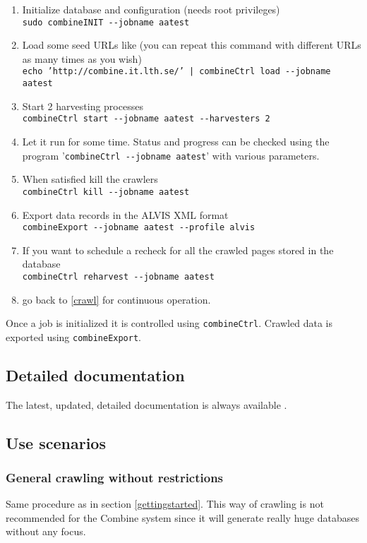 \begin{enumerate}
\item    Initialize database and configuration (needs root privileges)\\
{\tt  sudo combineINIT \verb+--+jobname aatest}
\item \label{load} Load some seed URLs like (you can repeat this command with different URLs as many times as you wish)\\
{\tt  echo 'http://combine.it.lth.se/' | combineCtrl  load \verb+--+jobname aatest}
\item \label{crawl}   Start 2 harvesting processes\\
{\tt  combineCtrl  start \verb+--+jobname aatest \verb+--+harvesters 2}

\item Let it run for some time. Status and progress can be checked using
the program '{\tt combineCtrl \verb+--+jobname aatest}'
with various parameters.

\item    When satisfied kill the crawlers\\
{\tt  combineCtrl kill \verb+--+jobname aatest}
\item    Export data records in the ALVIS XML format\\
{\tt  combineExport \verb+--+jobname aatest \verb+--+profile alvis}

\item If you want to schedule a recheck for all the crawled pages stored in the database\\
{\tt combineCtrl reharvest \verb+--+jobname aatest}
\item go back to \ref{crawl} for continuous operation.
\end{enumerate}

Once a job is initialized it is controlled using
{\tt combineCtrl}. Crawled data is exported using {\tt combineExport}.

\subsection{Detailed documentation}
The latest, updated, detailed documentation is always available
.

\subsection{Use scenarios}
\subsubsection{General crawling without restrictions}
Same procedure as in section \ref{gettingstarted}. This way of
crawling is not recommended for the Combine system since it will
generate really huge databases without any focus.

